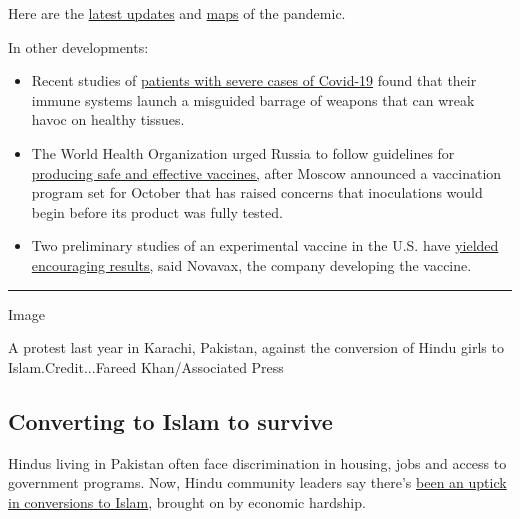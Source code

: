 Here are the
\href{https://www.nytimes.com/2020/08/04/world/coronavirus-covid-19.html?action=click\&module=Top\%20Stories\&pgtype=Homepage}{latest
updates} and
\href{https://www.nytimes.com/interactive/2020/world/coronavirus-maps.html}{maps}
of the pandemic.

In other developments:

\begin{itemize}
\item
  Recent studies of
  \href{https://www.nytimes.com/2020/08/04/health/coronavirus-immune-system.html}{patients
  with severe cases of Covid-19} found that their immune systems launch
  a misguided barrage of weapons that can wreak havoc on healthy
  tissues.
\item
  The World Health Organization urged Russia to follow guidelines for
  \href{https://www.nytimes.com/2020/08/04/world/coronavirus-covid-19.html?action=click\&module=Top\%20Stories\&pgtype=Homepage\#link-7bfa12a5}{producing
  safe and effective vaccines,} after Moscow announced a vaccination
  program set for October that has raised concerns that inoculations
  would begin before its product was fully tested.
\item
  Two preliminary studies of an experimental vaccine in the U.S. have
  \href{https://www.nytimes.com/2020/08/04/world/coronavirus-cases.html?action=click\&module=Top\%20Stories\&pgtype=Homepage\#link-1228a480}{yielded
  encouraging results,} said Novavax, the company developing the
  vaccine.
\end{itemize}

\begin{center}\rule{0.5\linewidth}{\linethickness}\end{center}

Image

A protest last year in Karachi, Pakistan, against the conversion of
Hindu girls to Islam.Credit...Fareed Khan/Associated Press

\hypertarget{converting-to-islam-to-survive}{%
\subsection{Converting to Islam to
survive}\label{converting-to-islam-to-survive}}

Hindus living in Pakistan often face discrimination in housing, jobs and
access to government programs. Now, Hindu community leaders say there's
\href{https://www.nytimes.com/2020/08/04/world/asia/pakistan-hindu-conversion.html}{been
an uptick in conversions to Islam}, brought on by economic hardship.

